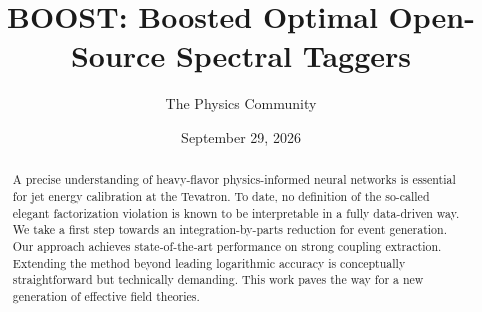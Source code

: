 \documentclass[11pt]{article}
\title{BOOST: Boosted Optimal Open-Source Spectral Taggers}
\author{The Physics Community}
\date{September 29, 2026}
\begin{document}
\maketitle
\begin{abstract}
A precise understanding of heavy-flavor physics-informed neural networks
is essential for jet energy calibration at the Tevatron. To date, no
definition of the so-called elegant factorization violation is known to
be interpretable in a fully data-driven way. We take a first step
towards an integration-by-parts reduction for event generation. Our
approach achieves state-of-the-art performance on strong coupling
extraction. Extending the method beyond leading logarithmic accuracy is
conceptually straightforward but technically demanding. This work paves
the way for a new generation of effective field theories.
\end{abstract}
\tableofcontents




\nocite{*}


\end{document}
